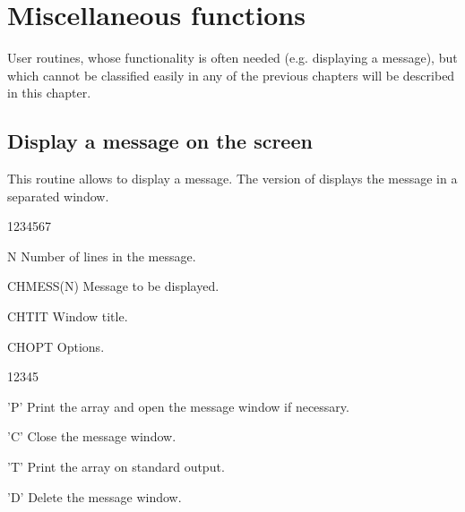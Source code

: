 
\chapter{Miscellaneous functions}

User routines, whose functionality is often needed (e.g. displaying a message),
but which cannot be classified easily in any of the previous chapters will be
described in this chapter.

\section{Display a message on the screen}
\Action
This routine allows to display a message. The  version of \HIGZ{} displays
the message in a separated window.
\Pdesc
\begin{DLtt}{1234567}
\item[N] Number of lines in the message.
\item[CHMESS(N)] Message to be displayed.
\item[CHTIT] Window title.
\item[CHOPT] Options.
\begin{DLtt}{12345}
\item['P'] Print the array  and open the message window
if necessary.
\item['C'] Close the message window.
\item['T'] Print the array  on standard output.
\item['D'] Delete the message window.
\end{DLtt}
\end{DLtt}

